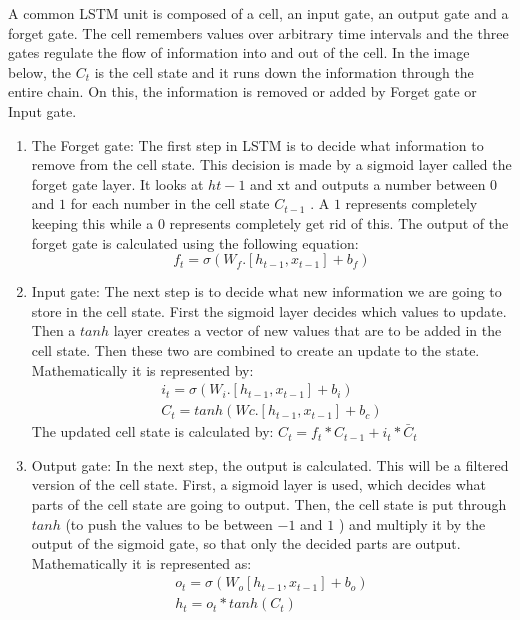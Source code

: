     A common LSTM unit is composed of a cell, an input gate, an output gate and a forget gate. The cell remembers values over arbitrary time intervals and the three gates regulate the flow of information into and out of the cell.
    In the image below, the $C_t $ is the cell state and it runs down the information through the entire chain. On this, the information is removed or added by Forget gate or Input gate. 
    \begin{enumerate}
    	\item The Forget gate: The first step in LSTM is to decide what information to remove from the cell state. This decision is made by a sigmoid layer called the forget gate layer. It looks at $h{t-1}$  and xt and outputs a number between $0$ and $1$  for each number in the cell state $C_{t-1} $ . A $1$ represents completely keeping this while a $0$  represents completely get rid of this. The output of the forget gate is calculated using the following equation: 
    	 \begin{equation}
    	 f_t=\sigma(W_f.[h_{t-1},x_{t-1}]+b_f)
    	 \end{equation}
    	 \item Input gate: The next step is to decide what new information we are going to store in the cell state. First the sigmoid layer decides which values to update. Then a $tanh$ layer creates a vector of new values that are to be added in the cell state. Then these two are combined to create an update to the state. Mathematically it is represented by: 
    	 \begin{gather}
    	 i_t=\sigma (W_i.[h_{t-1},x_{t-1}]+b_i)	\\		
    	 C_t=tanh(Wc.[h_{t-1},x_{t-1}]+b_c)
    	 \end{gather}
    	 The updated cell state is calculated by: $C_t=f_t*C_{t-1}+i_t*\bar{C}_t$
    	 \item Output gate: In the next step, the output is calculated. This will be a filtered version of the cell state. First, a sigmoid layer is used, which decides what parts of the cell state are going to output. Then, the cell state is put through $tanh$ (to push the values to be between $-1$ and $1$ ) and multiply it by the output of the sigmoid gate, so that only the decided parts are output. Mathematically it is represented as: 
    	  \begin{gather}
    	o_t=\sigma (W_o[h_{t-1},x_{t-1}]+b_o)\\				
    	h_t=o_t*tanh(C_t)
    	  \end{gather}
    	 
    \end{enumerate}
 
